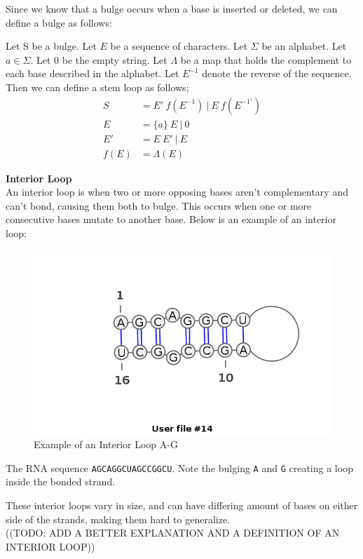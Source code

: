 Since we know that a bulge occurs when a base is inserted or deleted, we can 
define a bulge as follows:
\begin{mydef}\centering
Let S be a bulge. Let $E$ be a sequence of characters. Let $\Sigma$ be an alphabet. 
Let $a \in \Sigma$. Let $0$ be the empty string. Let $\Lambda$ be a map that holds the complement to each 
base described in the alphabet. Let $E^{-1}$ denote the reverse of the sequence. 
Then we can define a stem loop as follows;
\begin{align*}
S    &= E'~f(E^{-1})~|~E~f(E^{-1\prime})\\
E    &= \{a\}~E~|~0\\
E'   &= E~E'~|~E\\
f(E) &= \Lambda(E)
\end{align*}
\end{mydef}
\textbf{Interior Loop}\\
An interior loop is when two or more opposing bases aren't complementary and 
can't bond, causing them both to bulge. This occurs when one or more 
consecutive bases mutate to another base. Below is an example of an interior 
loop:
\begin{myex}\centering
\begin{figure}[h!]
\centering
\includegraphics[scale=0.5]{./lib/interior-loop.png}
\caption{Example of an Interior Loop A-G}
\end{figure}
The RNA sequence {\tt AGCAGGCUAGCCGGCU}. Note the bulging {\tt A} and {\tt G} 
creating a loop inside the bonded strand.
\end{myex}
These interior loops vary in size, and can have differing amount of bases on 
either side of the strands, making them hard to generalize.\\
((TODO: ADD A BETTER EXPLANATION AND A DEFINITION OF AN INTERIOR LOOP))
